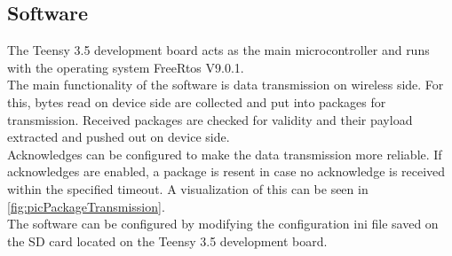 \subsection{Software} \label{sec:txtSwOutcomeVa1}
The Teensy 3.5 development board acts as the main microcontroller and runs with the operating system FreeRtos V9.0.1.\\
The main functionality of the software is data transmission on wireless side. For this, bytes read on device side are collected and put into packages for transmission. Received packages are checked for validity and their payload extracted and pushed out on device side.\\
Acknowledges can be configured to make the data transmission more reliable. If acknowledges are enabled, a package is resent in case no acknowledge is received within the specified timeout. A visualization of this can be seen in \autoref{fig:picPackageTransmission}.\\
%
%
%
The software can be configured by modifying the configuration ini file saved on the SD card located on the Teensy 3.5 development board.\\
